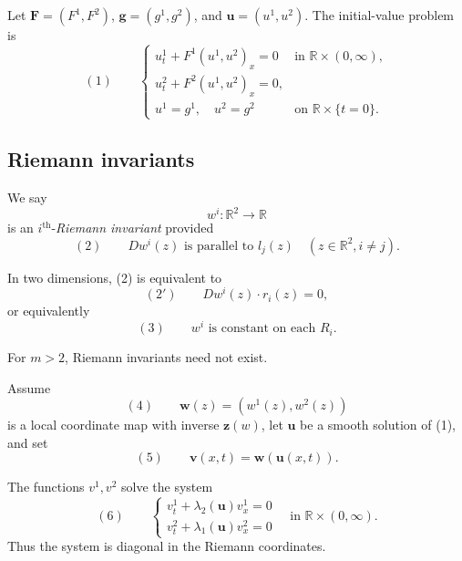 Let $\mathbf F=(F^1,F^2)$, $\mathbf g=(g^1,g^2)$, and $\mathbf u=(u^1,u^2)$. The initial-value problem is
\[
(1)\qquad
\begin{cases}
u^1_t+F^1(u^1,u^2)_x=0 & \text{in }\mathbb R\times(0,\infty),\\
u^2_t+F^2(u^1,u^2)_x=0,\\
u^1=g^1,\quad u^2=g^2 & \text{on }\mathbb R\times\{t=0\}.
\end{cases}
\]

\subsection{Riemann invariants}\label{sec:riemann-invariants}

\begin{definition}
\label{def:riemann-invariant}
We say
$$w^i:\mathbb{R}^2\to\mathbb{R}$$
is an $i^{\text{th}}$-\textit{Riemann invariant} provided
$$(2) \qquad Dw^i(z) \text{ is parallel to } l_j(z) \quad (z\in\mathbb{R}^2, i\neq j).$$
\end{definition}

In two dimensions, (2) is equivalent to
\[
(2')\qquad Dw^i(z)\cdot r_i(z)=0,
\]
or equivalently
\[
(3)\qquad w^i\text{ is constant on each }R_i.
\]

\begin{remark}
\label{rem:riemann-invariants-mgt2-remark}
For $m>2$, Riemann invariants need not exist.
\end{remark}

Assume
\[
(4)\qquad \mathbf w(z)=(w^1(z),w^2(z))
\]
is a local coordinate map with inverse $\mathbf z(w)$, let $\mathbf u$ be a smooth solution of (1), and set
\[
(5)\qquad \mathbf v(x,t)=\mathbf w(\mathbf u(x,t)).
\]

\begin{theorem}
\label{thm:conservation-laws-riemann-invariants}
The functions $v^1, v^2$ solve the system
$$(6) \qquad \begin{cases} v^1_t + \lambda_2(\mathbf{u})v^1_x = 0 \\ v^2_t + \lambda_1(\mathbf{u})v^2_x = 0 \end{cases} \quad \text{in } \mathbb{R}\times(0,\infty).$$
Thus the system is diagonal in the Riemann coordinates.
\end{theorem}

